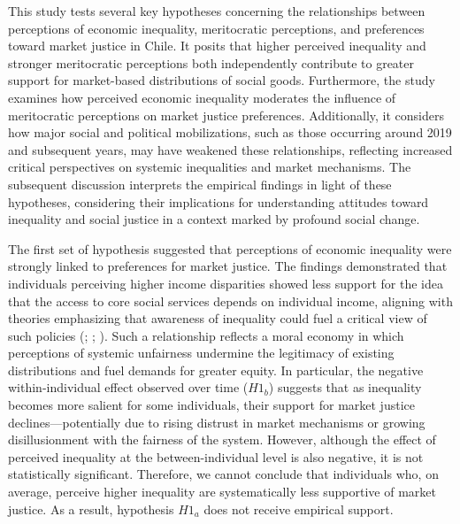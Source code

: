 \documentclass[
  12pt,
]{article}
\begin{document}
This study tests several key hypotheses concerning the relationships
between perceptions of economic inequality, meritocratic perceptions,
and preferences toward market justice in Chile. It posits that higher
perceived inequality and stronger meritocratic perceptions both
independently contribute to greater support for market-based
distributions of social goods. Furthermore, the study examines how
perceived economic inequality moderates the influence of meritocratic
perceptions on market justice preferences. Additionally, it considers
how major social and political mobilizations, such as those occurring
around 2019 and subsequent years, may have weakened these relationships,
reflecting increased critical perspectives on systemic inequalities and
market mechanisms. The subsequent discussion interprets the empirical
findings in light of these hypotheses, considering their implications
for understanding attitudes toward inequality and social justice in a
context marked by profound social change.

The first set of hypothesis suggested that perceptions of economic
inequality were strongly linked to preferences for market justice. The
findings demonstrated that individuals perceiving higher income
disparities showed less support for the idea that the access to core
social services depends on individual income, aligning with theories
emphasizing that awareness of inequality could fuel a critical view of
such policies (;
;
). Such a relationship
reflects a moral economy in which perceptions of systemic unfairness
undermine the legitimacy of existing distributions and fuel demands for
greater equity. In particular, the negative within-individual effect
observed over time (\(H1_{b}\)) suggests that as inequality becomes more
salient for some individuals, their support for market justice
declines---potentially due to rising distrust in market mechanisms or
growing disillusionment with the fairness of the system. However,
although the effect of perceived inequality at the between-individual
level is also negative, it is not statistically significant. Therefore,
we cannot conclude that individuals who, on average, perceive higher
inequality are systematically less supportive of market justice. As a
result, hypothesis \(H1_{a}\) does not receive empirical support.
\end{document}
